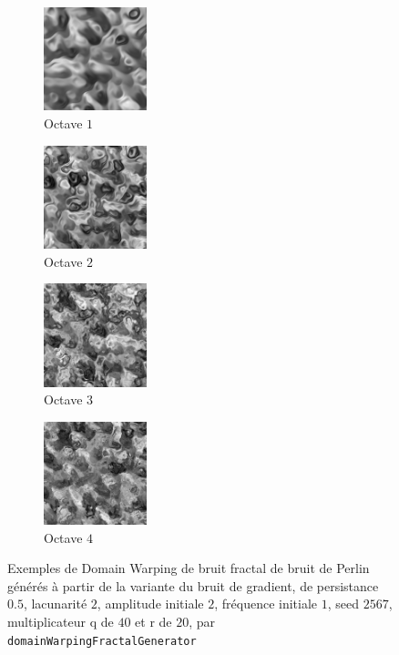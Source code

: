 \documentclass[11pt]{article}
\begin{document}
\begin{figure}[H]
    \centering
    \begin{subfigure}{0.2\textwidth}
    \centering
            \includegraphics[width=3cm]{WARP-FBM-GRADIENT-O1-P05-L2-IA2-IF1-S2567-Q40-R20.png}
        \caption{Octave $1$}
        \label{fig:warpFbmGradientO1}
    \end{subfigure}
    \begin{subfigure}{0.2\textwidth}
    \centering
        \includegraphics[width=3cm]{WARP-FBM-GRADIENT-O2-P05-L2-IA2-IF1-S2567-Q40-R20.png}
        \caption{Octave $2$}
        \label{fig:warpFbmGradientO2}
    \end{subfigure}
    \begin{subfigure}{0.2\textwidth}
    \centering
        \includegraphics[width=3cm]{WARP-FBM-GRADIENT-O3-P05-L2-IA2-IF1-S2567-Q40-R20.png}
        \caption{Octave $3$}
        \label{fig:warpFbmGradientO3}
    \end{subfigure}
    \begin{subfigure}{0.2\textwidth}
    \centering
        \includegraphics[width=3cm]{WARP-FBM-GRADIENT-O4-P05-L2-IA2-IF1-S2567-Q40-R20.png}
        \caption{Octave $4$}
        \label{fig:warpFbmGradientO4}
    \end{subfigure}
    \caption{Exemples de Domain Warping de bruit fractal de bruit de Perlin générés à partir de la variante du bruit de gradient, de persistance $0.5$, lacunarité $2$, amplitude initiale $2$, fréquence initiale $1$, seed $2567$, multiplicateur q de $40$ et r de $20$, par \texttt{domainWarpingFractalGenerator}}
    \label{fig:warpFbmGradient}
\end{figure}
\end{document}

